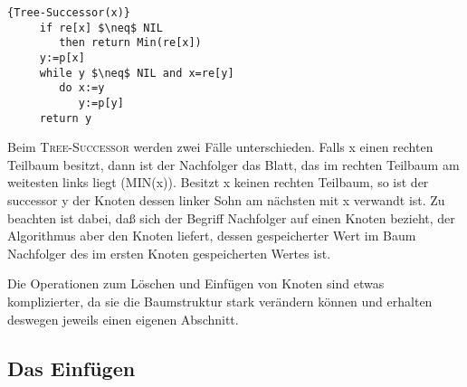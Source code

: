    \begin{Algorithmus}[H]
    \begin{lstlisting}[frame=tlrb, mathescape=true, title=\textsc{Tree-Successor\textnormal{(x)}}, gobble=4]{Tree-Successor(x)}
     if re[x] $\neq$ NIL
        then return Min(re[x])
     y:=p[x]
     while y $\neq$ NIL and x=re[y]
        do x:=y
           y:=p[y]
     return y
    \end{lstlisting}

   Beim \textsc{Tree-Successor} werden zwei Fälle unterschieden. Falls x 
   einen rechten Teilbaum besitzt, dann ist der Nachfolger das Blatt, das im 
   rechten Teilbaum am weitesten links liegt (\textsc{MIN}(x)). Besitzt x keinen 
   rechten Teilbaum, so ist der successor y der Knoten dessen linker Sohn 
   am nächsten mit x verwandt ist. Zu beachten ist dabei, daß sich der Begriff Nachfolger auf einen Knoten bezieht, der Algorithmus
   aber den Knoten liefert, dessen gespeicherter Wert im Baum Nachfolger des im ersten Knoten gespeicherten Wertes ist. 
   \end{Algorithmus}
   
Die Operationen zum Löschen und Einfügen von Knoten sind etwas komplizierter, da sie die Baumstruktur stark verändern können und
erhalten deswegen jeweils einen eigenen Abschnitt.
\subsection{Das Einfügen}


